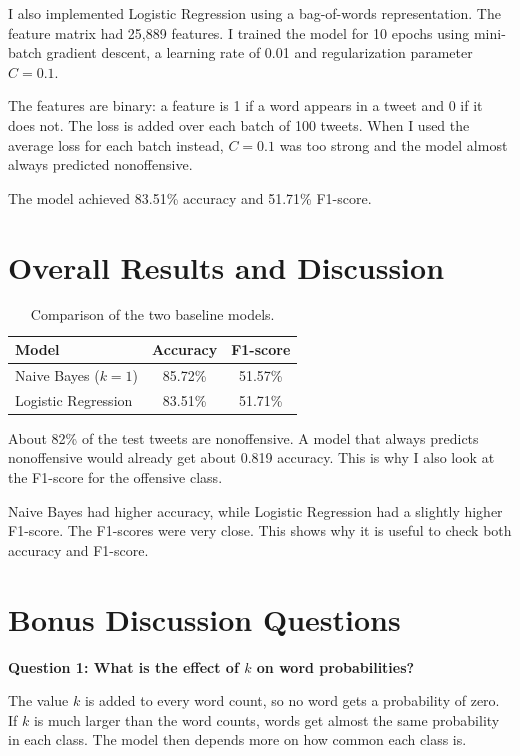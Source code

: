 \documentclass[a4paper,9pt]{article}
\begin{document}
I also implemented Logistic Regression using a bag-of-words
representation. The feature matrix had 25,889 features. I trained the
model for 10 epochs using mini-batch gradient descent, a learning rate
of 0.01 and regularization parameter \(C=0.1\).

The features are binary: a feature is 1 if a word appears in a tweet
and 0 if it does not. The loss is added over each batch of 100 tweets.
When I used the average loss for each batch instead, \(C=0.1\) was too
strong and the model almost always predicted nonoffensive.

The model achieved 83.51\% accuracy and 51.71\% F1-score.

\section{Overall Results and Discussion}

\begin{table}[H]
\centering
\small
\begin{tabular}{lcc}
\toprule
\textbf{Model} & \textbf{Accuracy} & \textbf{F1-score} \\
\midrule
Naive Bayes (\(k=1\)) & 85.72\% & 51.57\% \\
Logistic Regression & 83.51\% & 51.71\% \\
\bottomrule
\end{tabular}
\caption{Comparison of the two baseline models.}
\end{table}

About 82\% of the test tweets are nonoffensive. A model that always
predicts nonoffensive would already get about 0.819 accuracy. This is
why I also look at the F1-score for the offensive class.

Naive Bayes had higher accuracy, while Logistic Regression had a
slightly higher F1-score. The F1-scores were very close. This shows
why it is useful to check both accuracy and F1-score.

\section{Bonus Discussion Questions}

\textbf{Question 1: What is the effect of \(k\) on word probabilities?}

The value \(k\) is added to every word count, so no word gets a
probability of zero. If \(k\) is much larger than the word counts,
words get almost the same probability in each class. The model then
depends more on how common each class is.
\end{document}
